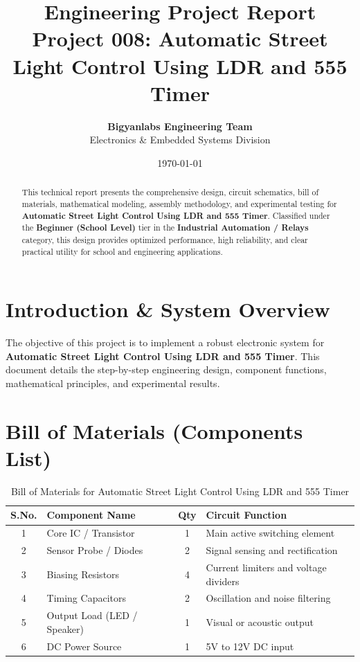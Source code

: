 \documentclass[11pt,a4paper]{article}
\title{\textbf{\Huge Engineering Project Report}\\[0.5em] \Large Project 008: Automatic Street Light Control Using LDR and 555 Timer}
\author{\textbf{Bigyanlabs Engineering Team}\\ Electronics \& Embedded Systems Division}
\date{\today}
\begin{document}
\maketitle
\thispagestyle{empty}

\begin{abstract}
This technical report presents the comprehensive design, circuit schematics, bill of materials, mathematical modeling, assembly methodology, and experimental testing for \textbf{Automatic Street Light Control Using LDR and 555 Timer}. Classified under the \textbf{Beginner (School Level)} tier in the \textbf{Industrial Automation / Relays} category, this design provides optimized performance, high reliability, and clear practical utility for school and engineering applications.
\end{abstract}

\newpage
\tableofcontents
\newpage

\section{Introduction \& System Overview}
The objective of this project is to implement a robust electronic system for \textbf{Automatic Street Light Control Using LDR and 555 Timer}. This document details the step-by-step engineering design, component functions, mathematical principles, and experimental results.

\section{Bill of Materials (Components List)}
\begin{table}[h!]
\centering
\caption{Bill of Materials for Automatic Street Light Control Using LDR and 555 Timer}
\vspace{0.5em}
\begin{tabular}{clcp{7cm}}
\toprule
\textbf{S.No.} & \textbf{Component Name} & \textbf{Qty} & \textbf{Circuit Function} \\
\midrule
1 & Core IC / Transistor & 1 & Main active switching element \\
2 & Sensor Probe / Diodes & 2 & Signal sensing and rectification \\
3 & Biasing Resistors & 4 & Current limiters and voltage dividers \\
4 & Timing Capacitors & 2 & Oscillation and noise filtering \\
5 & Output Load (LED / Speaker) & 1 & Visual or acoustic output \\
6 & DC Power Source & 1 & 5V to 12V DC input \\
\bottomrule
\end{tabular}
\end{table}
\end{document}
